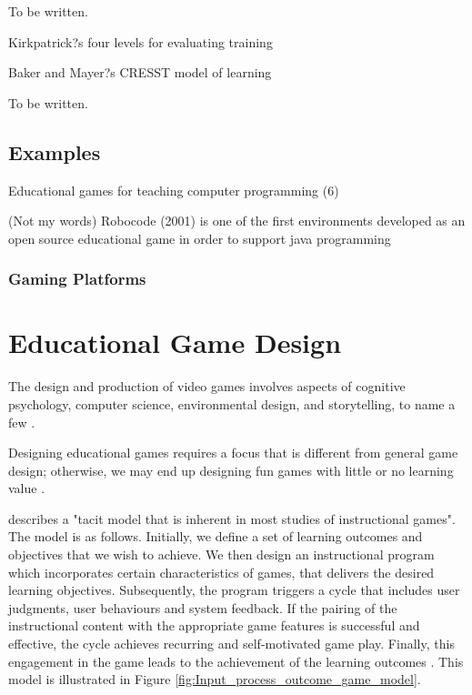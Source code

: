 \documentclass[a4paper,11.5pt]{report}
\numberwithin{figure}{section}
\numberwithin{table}{section}
\numberwithin{equation}{section}
\numberwithin{equation}{section}
\begin{document}
To be written.


Kirkpatrick?s four levels for evaluating training

Baker and Mayer?s CRESST model of learning

To be written.

\subsection{Examples}

Educational games for teaching computer programming (6)

(Not my words) Robocode (2001) is one of the first environments developed as an open source educational game in order to support java programming

\subsubsection{Gaming Platforms}

\section{Educational Game Design}

The design and production of video games involves aspects of cognitive psychology, computer science, environmental design, and storytelling, to name a few \citep{Koster2004}.

Designing educational games requires a focus that is different from general game design; otherwise, we may end up designing fun games with little or no learning value \citep{Barnes2007}.

\citeauthor{Driskell2002} describes a "tacit model that is inherent in most studies of instructional games". The model is as follows. Initially, we define a set of learning outcomes and objectives that we wish to achieve. We then design an instructional program which incorporates certain characteristics of games, that delivers the desired learning objectives. Subsequently, the program triggers a cycle that includes user judgments, user behaviours and system feedback. If the pairing of the instructional content with the appropriate game features is successful and effective, the cycle achieves recurring and self-motivated game play. Finally, this engagement in the game leads to the achievement of the learning outcomes \citep{Driskell2002}. This model is illustrated in Figure \ref{fig:Input_process_outcome_game_model}.
\end{document}
